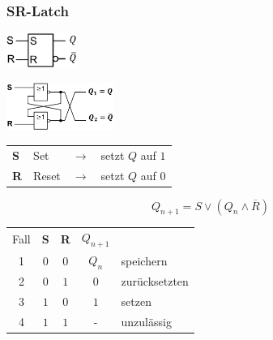\subsubsection{SR-Latch}
\begin{center}
    \begin{minipage}[c]{0.4\linewidth}
        \includegraphics[width = 23mm]{images/sr_latch.jpeg}
    \end{minipage}
    \hfill
    \begin{minipage}[c]{0.55\linewidth}
        \includegraphics[width = 35mm]{images/sr_latch_cir.jpeg}
    \end{minipage}
\end{center}
\begin{flushleft}
    \begin{tabular}{l l c l}
        \textbf{S} & Set & $\rightarrow$ & setzt $Q$ auf $1$\\
        \textbf{R} & Reset & $\rightarrow$ & setzt $Q$ auf $0$\\
    \end{tabular}
\end{flushleft}
\begin{equation*}
    Q_{n + 1} = S \lor \left(Q_n \land \overline{R}\right)
\end{equation*}
\begin{center}
    \begin{tabular}{c|c c|c l}
        Fall & \textbf{S} & \textbf{R} & $Q_{n + 1}$ & \\
        \cline{1-4}
        1 & $0$ & $0$ & $Q_n$ & speichern\\        
        2 & $0$ & $1$ & $0$ & zurücksetzten\\        
        3 & $1$ & $0$ & $1$ & setzen\\        
        4 & $1$ & $1$ & - & unzulässig\\        
    \end{tabular}
\end{center}
